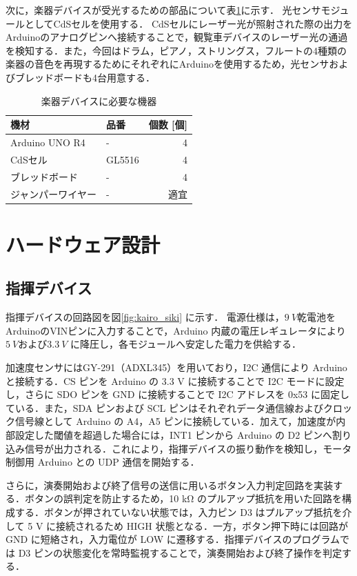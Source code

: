 \documentclass[lualatex,book,paper=a4paper,jafontsize=11.5pt,jafontscale=1.05]{jlreq}
\begin{document}
次に，楽器デバイスが受光するための部品について表\ref{table:ota}に示す．
光センサモジュールとしてCdSセルを使用する．
CdSセルにレーザー光が照射された際の出力をArduinoのアナログピンへ接続することで，観覧車デバイスのレーザー光の通過を検知する．また，今回はドラム，ピアノ，ストリングス，フルートの4種類の
楽器の音色を再現するためにそれぞれにArduinoを使用するため，光センサおよびブレッドボードも4台用意する．
\begin{table}[h]
    \caption{楽器デバイスに必要な機器}
    \centering
    \label{table:ota}
    \begin{tabular}{llr}\hline
    機材 & 品番 & 個数 [個] \\ \hline
    Arduino UNO R4 & -& 4 \\ \hline
    CdSセル  &GL5516& 4 \\ \hline
    ブレッドボード & -& 4 \\ \hline
    ジャンパーワイヤー & - & 適宜 \\ \hline
    \end{tabular}
\end{table}


\clearpage
\section{ハードウェア設計}
\subsection{指揮デバイス}
指揮デバイスの回路図を図\ref{fig:kairo_siki} に示す．
電源仕様は，$\SI{9}{V}$乾電池をArduinoのVINピンに入力することで，Arduino 内蔵の電圧レギュレータにより$\SI{5}{V}$および$\SI{3.3}{V}$ に降圧し，各モジュールへ安定した電力を供給する．

加速度センサにはGY-291（ADXL345）を用いており，I2C 通信により Arduino と接続する．CS ピンを Arduino の 3.3 V に接続することで I2C モードに設定し，さらに SDO ピンを GND に接続することで I2C アドレスを 0x53 に固定している．また，SDA ピンおよび SCL ピンはそれぞれデータ通信線およびクロック信号線として Arduino の A4，A5 ピンに接続している．加えて，加速度が内部設定した閾値を超過した場合には，INT1 ピンから Arduino の D2 ピンへ割り込み信号が出力される．これにより，指揮デバイスの振り動作を検知し，モータ制御用 Arduino との UDP 通信を開始する．

さらに，演奏開始および終了信号の送信に用いるボタン入力判定回路を実装する．ボタンの誤判定を防止するため，10 kΩ のプルアップ抵抗を用いた回路を構成する．ボタンが押されていない状態では，入力ピン D3 はプルアップ抵抗を介して 5 V に接続されるため HIGH 状態となる．一方，ボタン押下時には回路が GND に短絡され，入力電位が LOW に遷移する．指揮デバイスのプログラムでは D3 ピンの状態変化を常時監視することで，演奏開始および終了操作を判定する．
\end{document}
